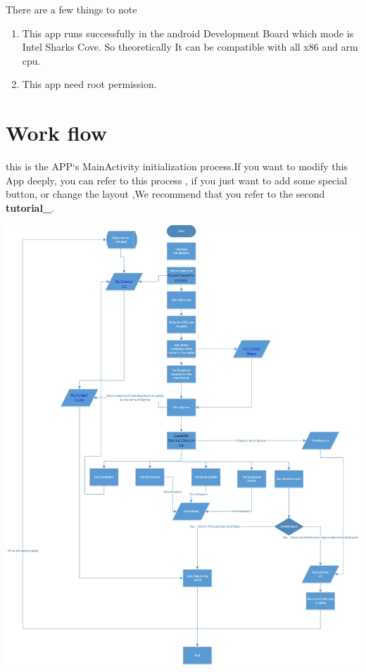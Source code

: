 \documentclass[letterpaper,10pt,english]{sphinxmanual}
\begin{document}
\begin{CJK}{UTF8}{gbsn}
There are a few things to note
\begin{enumerate}
\item {} 
This app runs successfully in the android Development Board which mode is Intel Sharks Cove. So theoretically It can be compatible with all x86 and arm cpu.

\item {} 
This app need root permission.

\end{enumerate}


\section{Work flow}
\label{base:work-flow}\label{base:tutorialr}
this is the APP‘s MainActivity initialization process.If you want to modify this App deeply, you can refer to this process , if you just want to add some special button, or change the layout ,We recommend that you refer to the second {\color{red}\bfseries{}tutorial\_}.

\includegraphics{workflow.jpg}



\end{CJK}
\end{document}
